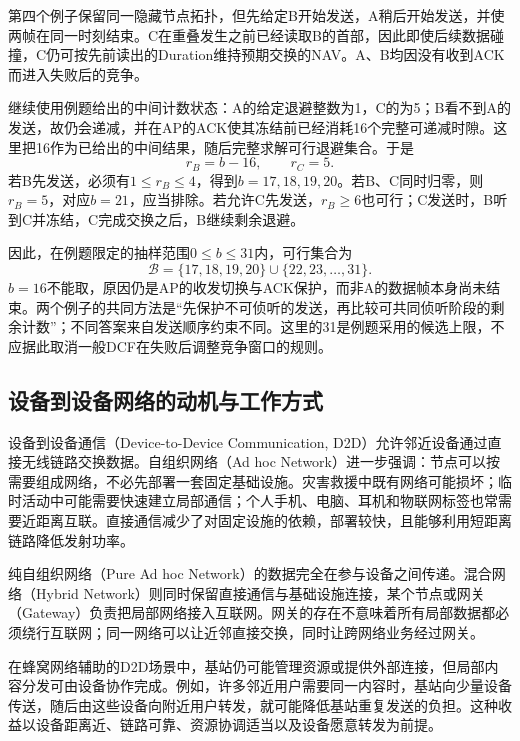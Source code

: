 第四个例子保留同一隐藏节点拓扑，但先给定B开始发送，A稍后开始发送，并使两帧在同一时刻结束。C在重叠发生之前已经读取B的首部，因此即使后续数据碰撞，C仍可按先前读出的Duration维持预期交换的NAV。A、B均因没有收到ACK而进入失败后的竞争。

继续使用例题给出的中间计数状态：A的给定退避整数为1，C的为5；B看不到A的发送，故仍会递减，并在AP的ACK使其冻结前已经消耗16个完整可递减时隙。这里把16作为已给出的中间结果，随后完整求解可行退避集合。于是
\begin{equation}
 r_B=b-16,\qquad r_C=5.
\end{equation}
若B先发送，必须有$1\leq r_B\leq4$，得到$b=17,18,19,20$。若B、C同时归零，则$r_B=5$，对应$b=21$，应当排除。若允许C先发送，$r_B\geq6$也可行；C发送时，B听到C并冻结，C完成交换之后，B继续剩余退避。

因此，在例题限定的抽样范围$0\leq b\leq31$内，可行集合为
\begin{equation}
 \mathcal{B}=\{17,18,19,20\}\cup\{22,23,\ldots,31\}.
\end{equation}
$b=16$不能取，原因仍是AP的收发切换与ACK保护，而非A的数据帧本身尚未结束。两个例子的共同方法是“先保护不可侦听的发送，再比较可共同侦听阶段的剩余计数”；不同答案来自发送顺序约束不同。这里的31是例题采用的候选上限，不应据此取消一般DCF在失败后调整竞争窗口的规则。

\subsection{设备到设备网络的动机与工作方式}

设备到设备通信（Device-to-Device Communication, D2D）允许邻近设备通过直接无线链路交换数据。自组织网络（Ad hoc Network）进一步强调：节点可以按需要组成网络，不必先部署一套固定基础设施。灾害救援中既有网络可能损坏；临时活动中可能需要快速建立局部通信；个人手机、电脑、耳机和物联网标签也常需要近距离互联。直接通信减少了对固定设施的依赖，部署较快，且能够利用短距离链路降低发射功率。

纯自组织网络（Pure Ad hoc Network）的数据完全在参与设备之间传递。混合网络（Hybrid Network）则同时保留直接通信与基础设施连接，某个节点或网关（Gateway）负责把局部网络接入互联网。网关的存在不意味着所有局部数据都必须绕行互联网；同一网络可以让近邻直接交换，同时让跨网络业务经过网关。

在蜂窝网络辅助的D2D场景中，基站仍可能管理资源或提供外部连接，但局部内容分发可由设备协作完成。例如，许多邻近用户需要同一内容时，基站向少量设备传送，随后由这些设备向附近用户转发，就可能降低基站重复发送的负担。这种收益以设备距离近、链路可靠、资源协调适当以及设备愿意转发为前提。

